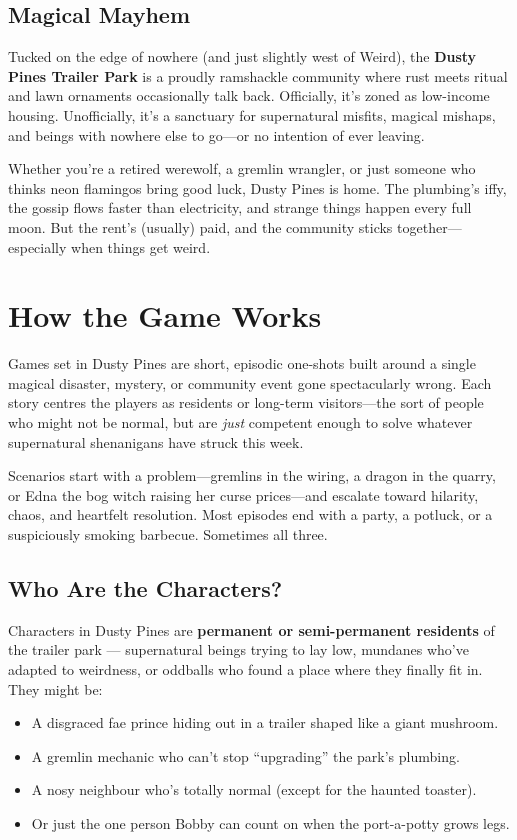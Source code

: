 \subsection{Magical Mayhem}

Tucked on the edge of nowhere (and just slightly west of Weird), the \textbf{Dusty Pines Trailer Park} is a proudly ramshackle community where rust meets ritual and lawn ornaments occasionally talk back. Officially, it’s zoned as low-income housing. Unofficially, it’s a sanctuary for supernatural misfits, magical mishaps, and beings with nowhere else to go---or no intention of ever leaving.

Whether you’re a retired werewolf, a gremlin wrangler, or just someone who thinks neon flamingos bring good luck, Dusty Pines is home. The plumbing’s iffy, the gossip flows faster than electricity, and strange things happen every full moon. But the rent’s (usually) paid, and the community sticks together---especially when things get weird.

\section{How the Game Works}

Games set in Dusty Pines are short, episodic one-shots built around a single magical disaster, mystery, or community event gone spectacularly wrong. Each story centres the players as residents or long-term visitors---the sort of people who might not be normal, but are \textit{just} competent enough to solve whatever supernatural shenanigans have struck this week.

Scenarios start with a problem---gremlins in the wiring, a dragon in the quarry, or Edna the bog witch raising her curse prices---and escalate toward hilarity, chaos, and heartfelt resolution. Most episodes end with a party, a potluck, or a suspiciously smoking barbecue. Sometimes all three.

\subsection{Who Are the Characters?}

Characters in Dusty Pines are \textbf{permanent or semi-permanent residents} of the trailer park --- supernatural beings trying to lay low, mundanes who’ve adapted to weirdness, or oddballs who found a place where they finally fit in. They might be:

\begin{itemize}
  \item A disgraced fae prince hiding out in a trailer shaped like a giant mushroom.
  \item A gremlin mechanic who can’t stop ``upgrading'' the park’s plumbing.
  \item A nosy neighbour who’s totally normal (except for the haunted toaster).
  \item Or just the one person Bobby can count on when the port-a-potty grows legs.
\end{itemize}

